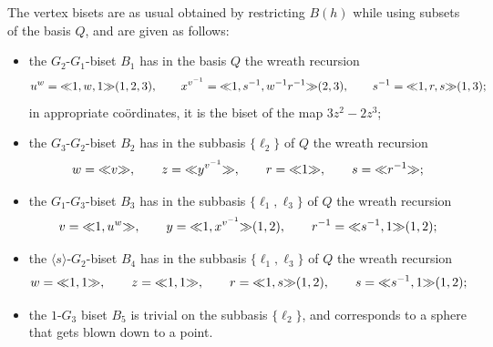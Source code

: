 \documentclass{amsart}
\begin{document}
The vertex bisets are as usual obtained by restricting $B(h)$ while using
subsets of the basis $Q$, and are given as follows:
\begin{itemize}
\item the $G_2$-$G_1$-biset $B_1$ has in the basis $Q$
  the wreath recursion
  \[u^w={\ll}1,w,1{\gg}(1,2,3), \qquad x^{v^{-1}}={\ll}1,s^{-1},w^{-1}r^{-1}{\gg}(2,3),\qquad
  s^{-1}={\ll}1,r,s{\gg}(1,3);\]
  in appropriate co\"ordinates, it is the biset of the map
  $3z^2-2z^3$;
\item the $G_3$-$G_2$-biset $B_2$ has in the subbasis
  $\{\ell_2\}$ of $Q$ the wreath recursion
  \[w={\ll}v{\gg},\qquad z={\ll}y^{v^{-1}}{\gg},\qquad r={\ll}1{\gg},\qquad s={\ll}r^{-1}{\gg};\]
\item the $G_1$-$G_3$-biset $B_3$ has in the subbasis
  $\{\ell_1,\ell_3\}$ of $Q$ the wreath recursion
  \[v={\ll}1,u^w{\gg},\qquad y={\ll}1,x^{v^{-1}}{\gg}(1,2),\qquad r^{-1}={\ll}s^{-1},1{\gg}(1,2);\]
\item the $\langle s\rangle$-$G_2$-biset $B_4$ has in the subbasis
  $\{\ell_1,\ell_3\}$ of $Q$ the wreath recursion
  \[w={\ll}1,1{\gg},\qquad z={\ll}1,1{\gg},\qquad r={\ll}1,s{\gg}(1,2),\qquad s={\ll}s^{-1},1{\gg}(1,2);\]
\item the $1$-$G_3$ biset $B_5$ is trivial on the subbasis
  $\{\ell_2\}$, and corresponds to a sphere that gets blown down to a
  point.
\end{itemize}
\end{document}
